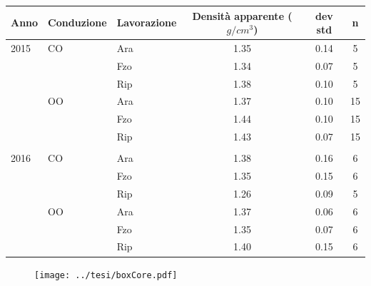 \documentclass[10pt]{beamer}
\begin{document}
\begin{frame}[label=Core]

  \vspace{1.5cm}
  \hyperlink{densita}{}
  \footnotesize
  \begin{table}[ht]
    \centering
    \begin{tabular}{lllccc}
      \hline
      Anno & Conduzione & Lavorazione & Densit\`a apparente
                                        ($g/cm^3$) & dev std & n \\ 
      \hline
      2015 & CO & Ara & 1.35 & 0.14 &   5 \\ 
           &    & Fzo & 1.34 & 0.07 &   5 \\ 
           &    & Rip & 1.38 & 0.10 &   5 \\ 
           & OO & Ara & 1.37 & 0.10 &  15 \\ 
           &    & Fzo & 1.44 & 0.10 &  15 \\ 
           &    & Rip & 1.43 & 0.07 &  15 \\ 
      \\
      2016 & CO & Ara & 1.38 & 0.16 &   6 \\ 
           &    & Fzo & 1.35 & 0.15 &   6 \\ 
           &    & Rip & 1.26 & 0.09 &   5 \\ 
           & OO & Ara & 1.37 & 0.06 &   6 \\ 
           &    & Fzo & 1.35 & 0.07 &   6 \\ 
           &    & Rip & 1.40 & 0.15 &   6 \\ 
      \hline
    \end{tabular}
    \label{tab:RiassuntoDensitaCAmpo}
  \end{table}
\end{frame}


\begin{frame}
  \vspace{1.5cm}
  \begin{figure}
    \texttt{[image: ../tesi/boxCore.pdf]}
  \end{figure}
\end{frame}
\end{document}
